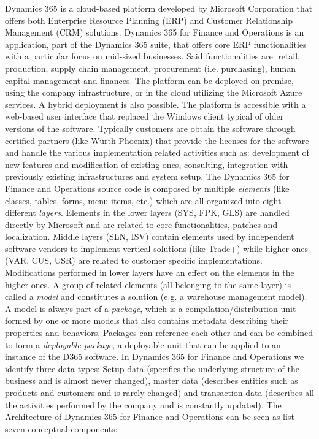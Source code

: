 Dynamics 365 \cite{D365Book} is a cloud-based platform developed by Microsoft Corporation that offers both Enterprise Resource Planning (ERP) and Customer Relationship Management (CRM) solutions. Dynamics 365 for Finance and Operations is an application, part of the Dynamics 365 suite, that offers core ERP functionalities with a particular focus on mid-sized businesses. Said functionalities are: retail, production, supply chain management, procurement (i.e. purchasing), human capital management and finances. The platform can be deployed on-premise, using the company infrastructure, or in the cloud utilizing the Microsoft Azure services. A hybrid deployment is also possible. The platform is accessible with a web-based user interface that replaced the Windows client typical of older versions of the software. Typically customers are obtain the software through certified partners (like Würth Phoenix) that provide the licenses for the software and handle the various implementation related activities such as: development of new features and modification of existing ones, consulting, integration with previously existing infrastructures and system setup. The Dynamics 365 for Finance and Operations source code is composed by multiple \textit{elements} (like classes, tables, forms, menu items, etc.) which are all organized into eight different \textit{layers}. Elements in the lower layers (SYS, FPK, GLS) are handled directly by Microsoft and are related to core functionalities, patches and localization. Middle layers (SLN, ISV) contain elements used by independent software vendors to implement vertical solutions (like Trade+) while higher ones (VAR, CUS, USR) are related to customer specific implementations. Modifications performed in lower layers have an effect on the elements in the higher ones. A group of related elements (all belonging to the same layer) is called a \textit{model} and constitutes a solution (e.g. a warehouse management model). A model is always part of a \textit{package}, which is a compilation/distribution unit formed by one or more models that also contains metadata describing their properties and behaviors. Packages can reference each other and can be combined to form a \textit{deployable package}, a deployable unit that can be applied to an instance of the D365 software. In Dynamics 365 for Finance and Operations we identify three data types: Setup data (specifies the underlying structure of the business and is almost never changed), master data (describes entities such as products and customers and is rarely changed) and transaction data (describes all the activities performed by the company and is constantly updated). The Architecture \cite{D365Book2} of Dynamics 365 for Finance and Operations can be seen as list seven conceptual components:

